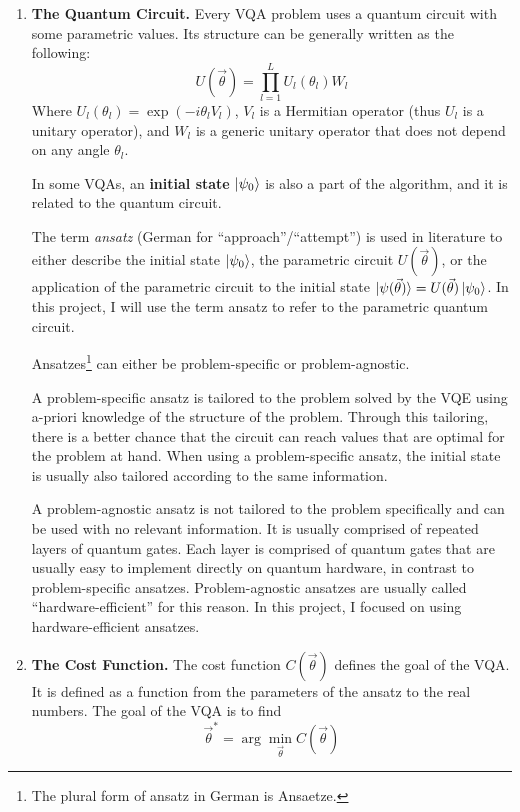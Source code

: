 \documentclass[a4paper,12pt]{article}
\newcommand{\thetas}{\vec{\theta}}
\begin{document}
\begin{enumerate}
    \item \textbf{The Quantum Circuit.} Every VQA problem uses a quantum circuit with some parametric values.
    Its structure can be generally written as the following:
    \begin{equation}
        U(\thetas) = \prod_{l=1}^{L} U_l(\theta_l) W_l
    \end{equation}
    Where $U_l(\theta_l) = \exp(-i\theta_l V_l)$, $V_l$ is a Hermitian operator (thus $U_l$ is a unitary operator), and $W_l$ is a generic unitary operator that does not depend on any angle $\theta_l$.
    
    In some VQAs, an \textbf{initial state} $\ket{\psi_0}$ is also a part of the algorithm, and it is related to the quantum circuit.

    The term \emph{ansatz} (German for ``approach''/``attempt'') is used in literature to either describe the initial state $\ket{\psi_0}$, the parametric circuit $U(\thetas)$, or the application of the parametric circuit to the initial state $\ket{\psi(\thetas)} = U(\thetas)\ket{\psi_0}$.
    In this project, I will use the term ansatz to refer to the parametric quantum circuit.

    Ansatzes\footnote{The plural form of ansatz in German is Ansaetze.} can either be problem-specific or problem-agnostic.

    A problem-specific ansatz is tailored to the problem solved by the VQE using a-priori knowledge of the structure of the problem. Through this tailoring, there is a better chance that the circuit can reach values that are optimal for the problem at hand. When using a problem-specific ansatz, the initial state is usually also tailored according to the same information.
    
    A problem-agnostic ansatz is not tailored to the problem specifically and can be used with no relevant information. It is usually comprised of repeated layers of quantum gates. Each layer is comprised of quantum gates that are usually easy to implement directly on quantum hardware, in contrast to problem-specific ansatzes. Problem-agnostic ansatzes are usually called ``hardware-efficient'' for this reason.
    In this project, I focused on using hardware-efficient ansatzes.
    
    \item \textbf{The Cost Function.} The cost function $C(\thetas)$ defines the goal of the VQA. It is defined as a function from the parameters of the ansatz to the real numbers.
    The goal of the VQA is to find
    \begin{equation}
        \thetas^* = \arg\min_{\thetas} C(\thetas)
    \end{equation}


\end{enumerate}
\end{document}
